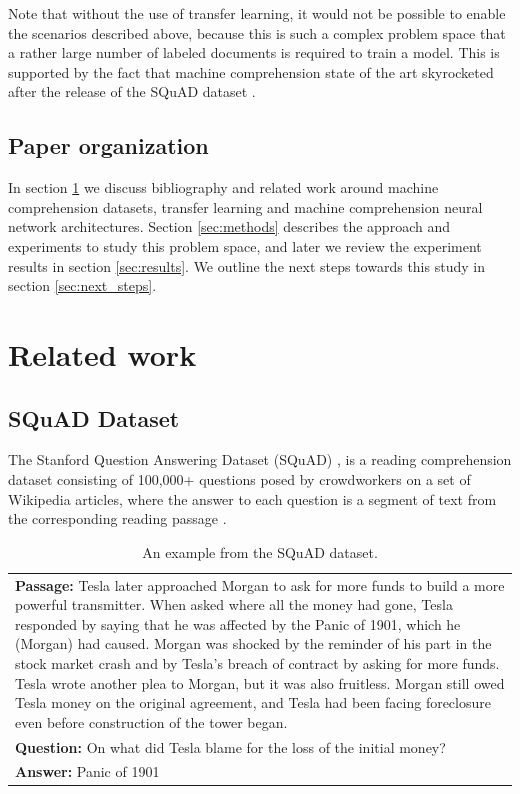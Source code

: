 \documentclass[11pt,a4paper]{article}
\begin{document}
Note that without the use of transfer learning, it would not be possible to enable the scenarios described above, because this is such a complex problem space that a rather large number of labeled documents is required to train a model. This is supported by the fact that machine comprehension state of the art skyrocketed after the release of the SQuAD dataset \cite{rnet} \cite{bidaf:2017}. 

\subsection{Paper organization}

In section \ref{sec:related_work} we discuss bibliography and related work around machine comprehension datasets, transfer learning and machine comprehension neural network architectures. Section \ref{sec:methods} describes the approach and experiments to study this problem space, and later we review the experiment results in section \ref{sec:results}. We outline the next steps towards this study in section \ref{sec:next_steps}.  


\section{Related work}
\label{sec:related_work}


\subsection{SQuAD Dataset}
\label{ssec:squad}

The Stanford Question Answering Dataset (SQuAD) \cite{rnet}, is a reading comprehension dataset consisting of 100,000+ questions posed by crowdworkers on a set of
Wikipedia articles, where the answer to each question is a segment of text from the corresponding reading passage \cite{squad:2016}.

\begin{table}
\centering
\begin{tabular}{|p{7cm}|}
 \hline
\textbf{Passage:} Tesla later approached Morgan to ask for more funds to build a more powerful transmitter. When asked where all the money had gone, Tesla responded by saying that he was affected by the Panic of 1901, which he (Morgan) had caused. Morgan was shocked by the reminder of his part in the stock market crash and by Tesla’s breach of contract by asking for more funds. Tesla wrote another plea to Morgan, but it was also fruitless. Morgan still owed Tesla money on the original agreement, and Tesla had been facing foreclosure even before construction of the tower began.\\ 
\textbf{Question:} On what did Tesla blame for the loss of the initial money?\\
\textbf{Answer:} Panic of 1901\\
 \hline
\end{tabular}
\caption{An example from the SQuAD dataset.
  }
\end{table}
\end{document}
